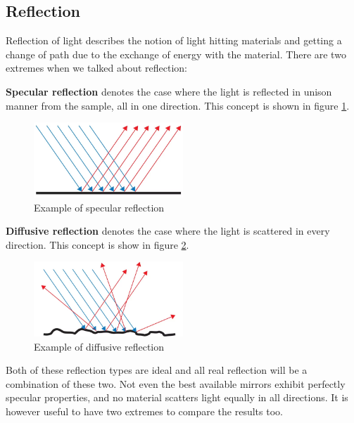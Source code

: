 \subsection{Reflection}
\label{sec:theory_reflection}
Reflection of light describes the notion of light hitting materials and getting a change of path due to the exchange of energy with the material. There are two extremes when we talked about reflection:

\textbf{Specular reflection} denotes the case where the light is reflected in unison manner from the sample, all in one direction. This concept is shown in figure \ref{fig:specular_reflection}.

\begin{figure}[h!]
    \centering
    \includegraphics[width=0.5\textwidth]{figures/theory/Specular-Reflection.png}
    \caption{Example of specular reflection \cite{SpecularReflectionOcean}}
    \label{fig:specular_reflection}
\end{figure}

\textbf{Diffusive reflection} denotes the case where the light is scattered in every direction. This concept is show in figure \ref{fig:diffusive_reflection}.

\begin{figure}[h!]
    \centering
    \includegraphics[width=0.5\textwidth]{figures/theory/Diffuse-Reflection.png}
    \caption{Example of diffusive reflection \cite{DiffuseReflectionOcean}}
    \label{fig:diffusive_reflection}
\end{figure}

Both of these reflection types are ideal and all real reflection will be a combination of these two. Not even the best available mirrors exhibit perfectly specular properties, and no material scatters light equally in all directions. It is however useful to have two extremes to compare the results too. 

